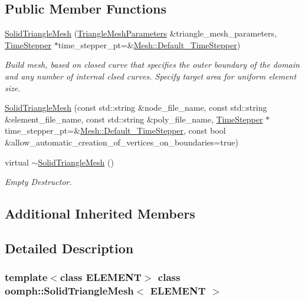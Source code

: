 \subsection*{Public Member Functions}
\begin{DoxyCompactItemize}
\item 
\hyperlink{classoomph_1_1SolidTriangleMesh_a0319b61fc3444922e2b55c9978f381f3}{Solid\+Triangle\+Mesh} (\hyperlink{classoomph_1_1TriangleMeshParameters}{Triangle\+Mesh\+Parameters} \&triangle\+\_\+mesh\+\_\+parameters, \hyperlink{classoomph_1_1TimeStepper}{Time\+Stepper} $\ast$time\+\_\+stepper\+\_\+pt=\&\hyperlink{classoomph_1_1Mesh_a12243d0fee2b1fcee729ee5a4777ea10}{Mesh\+::\+Default\+\_\+\+Time\+Stepper})
\begin{DoxyCompactList}\small\item\em Build mesh, based on closed curve that specifies the outer boundary of the domain and any number of internal clsed curves. Specify target area for uniform element size. \end{DoxyCompactList}\item 
\hyperlink{classoomph_1_1SolidTriangleMesh_a15a943bd43fece042e2ffdefc8ceb0f4}{Solid\+Triangle\+Mesh} (const std\+::string \&node\+\_\+file\+\_\+name, const std\+::string \&element\+\_\+file\+\_\+name, const std\+::string \&poly\+\_\+file\+\_\+name, \hyperlink{classoomph_1_1TimeStepper}{Time\+Stepper} $\ast$time\+\_\+stepper\+\_\+pt=\&\hyperlink{classoomph_1_1Mesh_a12243d0fee2b1fcee729ee5a4777ea10}{Mesh\+::\+Default\+\_\+\+Time\+Stepper}, const bool \&allow\+\_\+automatic\+\_\+creation\+\_\+of\+\_\+vertices\+\_\+on\+\_\+boundaries=true)
\item 
virtual \hyperlink{classoomph_1_1SolidTriangleMesh_a5ab5a2ac3aee1a80fbb72b27fc929783}{$\sim$\+Solid\+Triangle\+Mesh} ()
\begin{DoxyCompactList}\small\item\em Empty Destructor. \end{DoxyCompactList}\end{DoxyCompactItemize}
\subsection*{Additional Inherited Members}


\subsection{Detailed Description}
\subsubsection*{template$<$class E\+L\+E\+M\+E\+NT$>$\newline
class oomph\+::\+Solid\+Triangle\+Mesh$<$ E\+L\+E\+M\+E\+N\+T $>$}

